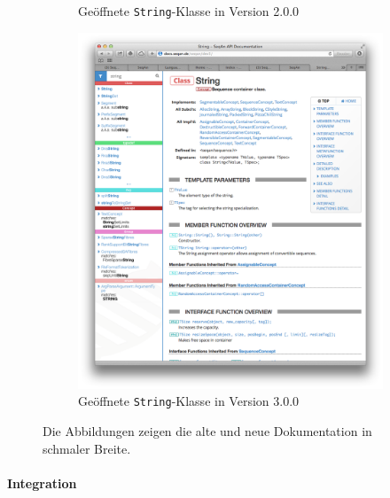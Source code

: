 \begin{figure}
\begin{subfigure}[b]{0.48\linewidth}
                \caption{Geöffnete \texttt{String}-Klasse in Version 2.0.0}
                \label{fig:dox-small-string-opened-2.0.0}
        \end{subfigure}
        \hfill
        \begin{subfigure}[b]{0.48\linewidth}
                \includegraphics[width=\linewidth]{Figures/dox/dox-3_0_0-small-string-opened.png}
                \caption{Geöffnete \texttt{String}-Klasse in Version 3.0.0}
                \label{fig:dox-small-string-opened-3.0.0}
        \end{subfigure}
        \caption[Alte und neue Dokumentation im Vergleich --- in smaler Breite]{Die Abbildungen zeigen die alte und neue Dokumentation in schmaler Breite.}
        \label{fig:dox-small-all}
\end{figure}
\restoregeometry




\paragraph{Integration}

